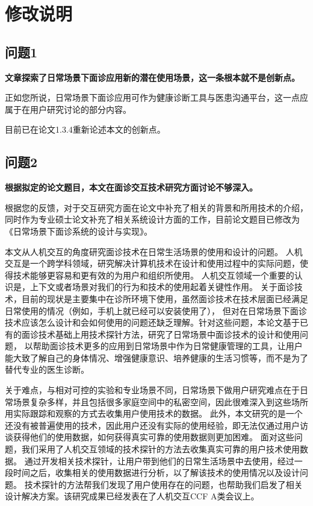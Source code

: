 
\chapter{修改说明}

\section{问题1}
\textbf{文章探索了日常场景下面诊应用新的潜在使用场景，这一条根本就不是创新点。}

正如您所说，日常场景下面诊应用可作为健康诊断工具与医患沟通平台，这一点应属于在用户研究讨论的部分内容。

目前已在论文1.3.4重新论述本文的创新点。

\section{问题2}
\textbf{根据拟定的论文题目，本文在面诊交互技术研究方面讨论不够深入。}

根据您的反馈，对于交互研究方面在论文中补充了相关的背景和所用技术的介绍，同时作为专业硕士论文补充了相关系统设计方面的工作，目前论文题目已修改为《日常场景下面诊系统的设计与实现》。

本文从人机交互的角度研究面诊技术在日常生活场景的使用和设计的问题。
人机交互是一个跨学科领域，研究解决计算机技术在设计和使用过程中的实际问题，使得技术能够更容易和更有效的为用户和组织所使用。
人机交互领域一个重要的认识是，上下文或者场景对我们的行为和技术的使用起着关键性作用\cite{1987Plans}。
关于面诊技术，目前的现状是主要集中在诊所环境下使用，虽然面诊技术在技术层面已经满足日常使用的情况（例如，手机上就已经可以安装使用了），
但对在日常场景下面诊技术应该怎么设计和会如何使用的问题还缺乏理解。针对这些问题，本论文基于已有的面诊技术基础上用技术探针方法，研究了日常场景中面诊技术的设计和使用问题，
以帮助面诊技术更多的应用到日常场景中作为日常健康管理的工具，让用户能大致了解自己的身体情况、增强健康意识、培养健康的生活习惯等，而不是为了替代专业的医生诊断。

关于难点，与相对可控的实验和专业场景不同，日常场景下做用户研究难点在于日常场景复杂多样，并且包括很多家庭空间中的私密空间，因此很难深入到这些场所用实际跟踪和观察的方式去收集用户使用技术的数据。
此外，本文研究的是一个还没有被普遍使用的技术，因此用户还没有实际的使用经验，即无法仅通过用户访谈获得他们的使用数据，如何获得真实可靠的使用数据则更加困难。
面对这些问题，我们采用了人机交互领域的技术探针的方法去收集真实可靠的用户技术使用数据。
通过开发相关技术探针，让用户带到他们的日常生活场景中去使用，经过一段时间之后，收集相关的使用数据进行分析，以了解该技术的使用情况以及设计问题。
技术探针的方法帮我们发现了用户使用存在的问题，也帮助我们启发了相关设计解决方案。该研究成果已经发表在了人机交互CCF A类会议上。

